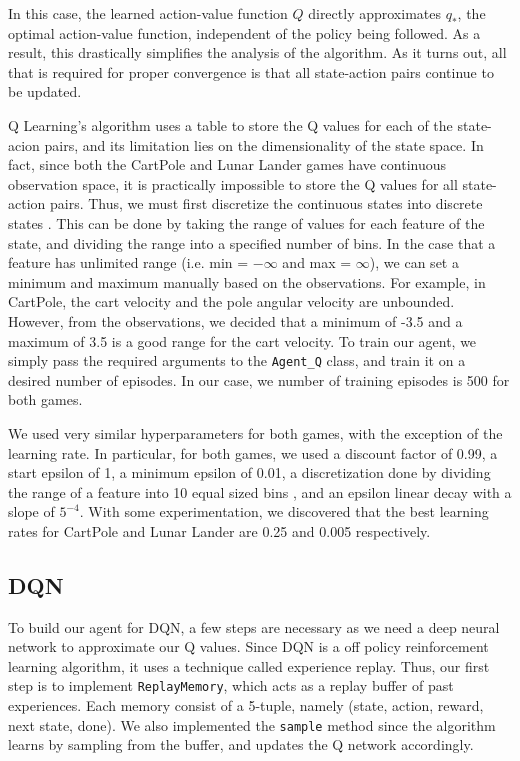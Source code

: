 \documentclass{article}
\begin{document}
In this case, the learned action-value function \(Q\) directly approximates
\(q_*\), the optimal action-value function, independent of the policy being
followed. As a result, this drastically simplifies the analysis of the
algorithm. As it turns out, all that is required for proper convergence is that
all state-action pairs continue to be updated\cite{sutton}.

Q Learning's algorithm uses a table to store the Q values for each of the
state-acion pairs, and its limitation lies on the dimensionality of the state
space. In fact, since both the CartPole and Lunar Lander games have continuous
observation space, it is practically impossible to store the Q values for all
state-action pairs. Thus, we must first discretize the continuous states into
discrete states \cite{discretization}. This can be done by taking the range of
values for each feature of the state, and dividing the range into a specified
number of bins. In the case that a feature has unlimited range (i.e. min =
\(-\infty\) and max = \(\infty\)), we can set a minimum and maximum manually
based on the observations. For example, in CartPole, the cart velocity and the
pole angular velocity are unbounded. However, from the observations, we decided
that a minimum of -3.5 and a maximum of 3.5 is a good range for the cart
velocity. To train our agent, we simply pass the required arguments to the
\verb+Agent_Q+ class, and train it on a desired number of episodes. In our
case, we number of training episodes is 500 for both games.

We used very similar hyperparameters for both games, with the exception of the
learning rate. In particular, for both games, we used a discount factor of
0.99, a start epsilon of 1, a minimum epsilon of 0.01, a discretization done by
dividing the range of a feature into 10 equal sized bins
\cite{discretization_tech}, and an epsilon linear decay with a slope of
\(5^{-4}\). With some experimentation, we discovered that the best learning
rates for CartPole and Lunar Lander are 0.25 and 0.005 respectively.

\subsection{DQN}
To build our agent for DQN, a few steps are necessary as we need a deep neural
network to approximate our Q values. Since DQN is a off policy reinforcement
learning algorithm, it uses a technique called experience replay. Thus, our
first step is to implement \verb+ReplayMemory+, which acts as a replay buffer
of past experiences. Each memory consist of a 5-tuple, namely (state, action,
reward, next state, done). We also implemented the \verb+sample+ method since
the algorithm learns by sampling from the buffer, and updates the Q network
accordingly.
\end{document}
